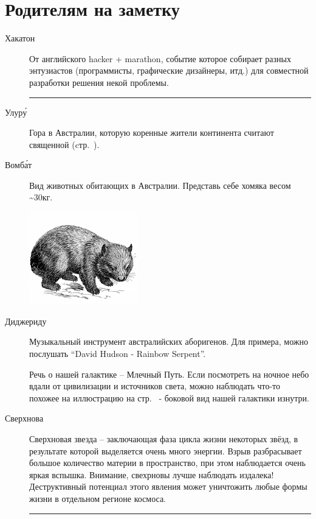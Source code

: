 \documentclass[a5paper,11pt]{memoir}
\begin{document}

\clearpage
\hfill
\clearpage
\section*{Родителям на заметку}


\begin{description}

\item[Хакатон] От английского hacker + marathon, событие которое собирает разных энтузиастов (программисты, графические дизайнеры, итд.) для совместной разработки решения некой проблемы. 
\fancybreak{*}

\item[Улур\'{у}] Гора в Австралии, которую коренные жители континента считают священной (cтр.~\pageref{uluru}).

\item[Вомб\'{а}т] Вид животных обитающих  в Австралии. Представь себе хомяка весом \textasciitilde30кг.
\begin{center}
\includegraphics[height=4cm]{images/wombat} 
\end{center}

\item[Диджериду] Музыкальный инструмент австралийских аборигенов. Для примера, можно послушать ``David Hudson - Rainbow Serpent''. 

\item[] Речь о нашей галактике -- Млечный Путь. Если посмотреть на ночное небо вдали от цивилизации и источников света, можно наблюдать что-то похожее на иллюстрацию на стр.~\pageref{milky-way} - боковой вид нашей галактики изнутри.

\item[Сверхнова] Сверхновая звезда -- заключающая фаза цикла жизни некоторых звёзд, в результате которой выделяется очень много энергии. Взрыв разбрасывает большое количество материи в пространство, при этом наблюдается очень яркая вспышка. Внимание, свехрновы лучше наблюдать издалека! Деструктивный потенциал этого явления может уничтожить любые формы жизни в отдельном регионе космоса. 
\fancybreak{*}


\end{description}
\end{document}
